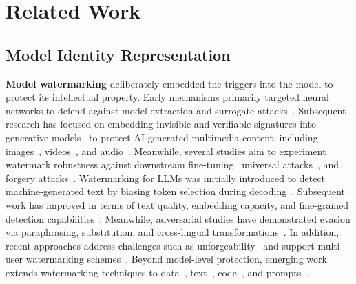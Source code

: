 \section{Related Work}

\subsection{Model Identity Representation}

\textbf{Model watermarking} deliberately embedded the triggers into the model to protect its intellectual property. Early mechanisms primarily targeted neural networks to defend against model extraction and surrogate attacks~\cite{zhang2024robust, zhu2024reliable, gan2023towards, li2022defending, li2023black, wang2024defense, charette2022cosine}. Subsequent research has focused on embedding invisible and verifiable signatures into generative models~\cite{yang2024gaussian, fernandez2023stable, wen2023tree, huang2024robin, liu2023mirror, hu2025videoshield, liu2024groot, zong2025audiomarknet} to protect AI-generated multimedia content, including images~\cite{wang2024achieving}, videos~\cite{hu2025videoshield}, and audio~\cite{zong2025audiomarknet, ji2025speech}. Meanwhile, several studies aim to experiment watermark robustness against downstream fine-tuning~\cite{wang2025sleepermark} universal attacks~\cite{muller2025black}, and forgery attacks~\cite{muller2025black}.
Watermarking for LLMs was initially introduced to detect machine-generated text by biasing token selection during decoding~\cite{kirchenbauer2023watermark}. Subsequent work has improved in terms of text quality, embedding capacity, and fine-grained detection capabilities~\cite{fu2024gumbelsoft, fu2024watermarking, wu2023resilient, wang2023towards, yoo2023robust, liu2024adaptive, huo2024token, chen2025improved, hou2024k, ren2024subtle, ji2024principled, qiang2023natural, li2024segmenting, zhao2025efficiently}. Meanwhile, adversarial studies have demonstrated evasion via paraphrasing, substitution, and cross-lingual transformations~\cite{wang2024stumbling, wu2024bypassing, he2024can, jovanovic2024watermark}. 
In addition, recent approaches address challenges such as unforgeability~\cite{liu2023unforgeable} and support multi-user watermarking schemes~\cite{cohen2025watermarking}. Beyond model-level protection, emerging work extends watermarking techniques to data~\cite{pan2025can}, text~\cite{zhou2024bileve}, code~\cite{sun2023codemark, yang2024srcmarker}, and prompts~\cite{yao2024promptcare}.

